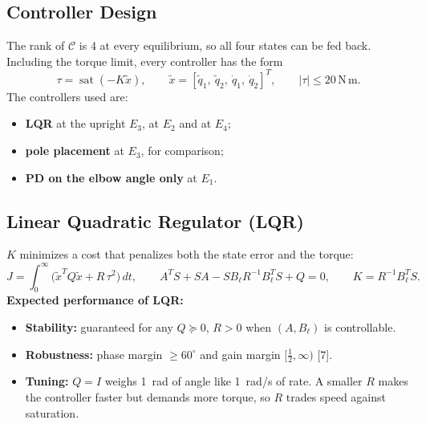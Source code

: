 \documentclass[12pt,a4paper]{article}
\newcommand{\Nm}{\,\mathrm{N\,m}}
\begin{document}
\subsection{Controller Design}
The rank of $\mathcal C$ is 4 at every equilibrium, so all four states can be fed back. Including the torque limit, every controller has the form
\begin{equation}
\tau=\operatorname{sat}(-K\tilde x),\qquad \tilde x=[\tilde q_1,\ \tilde q_2,\ \dot q_1,\ \dot q_2]^T,\qquad |\tau|\le20\Nm .
\end{equation}
The controllers used are:
\begin{itemize}
\item \textbf{LQR} at the upright $E_3$, at $E_2$ and at $E_4$;
\item \textbf{pole placement} at $E_3$, for comparison;
\item \textbf{PD on the elbow angle only} at $E_1$.
\end{itemize}

\subsection{Linear Quadratic Regulator (LQR)}
$K$ minimizes a cost that penalizes both the state error and the torque:
\begin{equation}
J=\int_0^\infty\big(\tilde x^TQ\tilde x+R\,\tau^2\big)\,dt,\qquad A^TS+SA-SB_\ell R^{-1}B_\ell^TS+Q=0,\qquad K=R^{-1}B_\ell^TS .
\end{equation}
\textbf{Expected performance of LQR:}
\begin{itemize}
\item \textbf{Stability:} guaranteed for any $Q\succeq0$, $R>0$ when $(A,B_\ell)$ is controllable.
\item \textbf{Robustness:} phase margin $\ge60^\circ$ and gain margin $[\frac12,\infty)$ [7].
\item \textbf{Tuning:} $Q=I$ weighs 1~rad of angle like 1~rad/s of rate. A smaller $R$ makes the controller faster but demands more torque, so $R$ trades speed against saturation.
\end{itemize}
\end{document}
